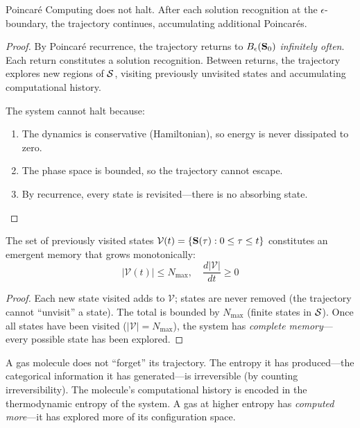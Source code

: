 \begin{theorem}
\label{thm:non_halting}
Poincar\'{e} Computing does not halt. After each solution recognition at the $\epsilon$-boundary, the trajectory continues, accumulating additional Poincar\'{e}s.
\end{theorem}

\begin{proof}
By Poincar\'{e} recurrence, the trajectory returns to $B_\epsilon(\mathbf{S}_0)$ \emph{infinitely often}. Each return constitutes a solution recognition. Between returns, the trajectory explores new regions of $\mathcal{S}$, visiting previously unvisited states and accumulating computational history.

The system cannot halt because:
\begin{enumerate}
    \item The dynamics is conservative (Hamiltonian), so energy is never dissipated to zero.
    \item The phase space is bounded, so the trajectory cannot escape.
    \item By recurrence, every state is revisited---there is no absorbing state.
\end{enumerate}
\end{proof}

\begin{theorem}
\label{thm:memory}
The set of previously visited states $\mathcal{V}(t) = \{\mathbf{S}(\tau) : 0 \leq \tau \leq t\}$ constitutes an emergent memory that grows monotonically:
\begin{equation}
    |\mathcal{V}(t)| \leq N_{\max}, \quad \frac{d|\mathcal{V}|}{dt} \geq 0
\end{equation}
\end{theorem}

\begin{proof}
Each new state visited adds to $\mathcal{V}$; states are never removed (the trajectory cannot ``unvisit'' a state). The total is bounded by $N_{\max}$ (finite states in $\mathcal{S}$). Once all states have been visited ($|\mathcal{V}| = N_{\max}$), the system has \emph{complete memory}---every possible state has been explored.
\end{proof}

\begin{remark}
A gas molecule does not ``forget'' its trajectory. The entropy it has produced---the categorical information it has generated---is irreversible (by counting irreversibility). The molecule's computational history is encoded in the thermodynamic entropy of the system. A gas at higher entropy has \emph{computed more}---it has explored more of its configuration space.
\end{remark}

